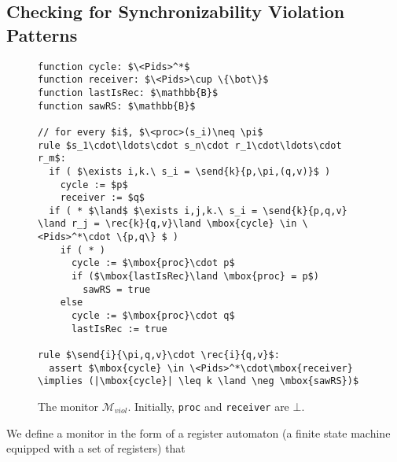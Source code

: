 \begin{lemma}

\end{lemma}

\subsection{Checking for Synchronizability Violation Patterns}

\begin{figure}
\begin{center}
\centering
\begin{lstlisting}
function cycle: $\<Pids>^*$
function receiver: $\<Pids>\cup \{\bot\}$
function lastIsRec: $\mathbb{B}$
function sawRS: $\mathbb{B}$

// for every $i$, $\<proc>(s_i)\neq \pi$
rule $s_1\cdot\ldots\cdot s_n\cdot r_1\cdot\ldots\cdot r_m$:
  if ( $\exists i,k.\ s_i = \send{k}{p,\pi,(q,v)}$ )
    cycle := $p$
    receiver := $q$
  if ( * $\land$ $\exists i,j,k.\ s_i = \send{k}{p,q,v} \land r_j = \rec{k}{q,v}\land \mbox{cycle} \in \<Pids>^*\cdot \{p,q\} $ )
    if ( * )
      cycle := $\mbox{proc}\cdot p$
      if ($\mbox{lastIsRec}\land \mbox{proc} = p$)
        sawRS = true
    else 
      cycle := $\mbox{proc}\cdot q$
      lastIsRec := true

rule $\send{i}{\pi,q,v}\cdot \rec{i}{q,v}$:
  assert $\mbox{cycle} \in \<Pids>^*\cdot\mbox{receiver} \implies (|\mbox{cycle}| \leq k \land \neg \mbox{sawRS})$
\end{lstlisting}
\end{center}
\caption{The monitor $\mathcal{M}_{\mathit{viol}}$. Initially, {\tt proc} and {\tt receiver} are $\bot$.}
\label{fig:mon_viol}
\end{figure}



We define a monitor in the form of a register automaton (a finite state machine equipped with a set of registers)
that 